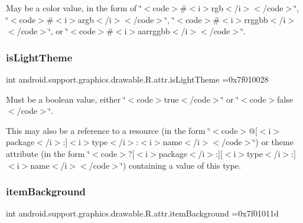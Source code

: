 May be a color value, in the form of \char`\"{}$<$code$>$\#$<$i$>$rgb$<$/i$>$$<$/code$>$\char`\"{}, \char`\"{}$<$code$>$\#$<$i$>$argb$<$/i$>$$<$/code$>$\char`\"{}, \char`\"{}$<$code$>$\#$<$i$>$rrggbb$<$/i$>$$<$/code$>$\char`\"{}, or \char`\"{}$<$code$>$\#$<$i$>$aarrggbb$<$/i$>$$<$/code$>$\char`\"{}. \mbox{\label{classandroid_1_1support_1_1graphics_1_1drawable_1_1R_1_1attr_a944a417aea3eaf866564a4350a4bd95a}} 
\subsubsection{\texorpdfstring{is\+Light\+Theme}{isLightTheme}}
{\footnotesize\ttfamily int android.\+support.\+graphics.\+drawable.\+R.\+attr.\+is\+Light\+Theme =0x7f010028\hspace{0.3cm}{\ttfamily [static]}}

Must be a boolean value, either \char`\"{}$<$code$>$true$<$/code$>$\char`\"{} or \char`\"{}$<$code$>$false$<$/code$>$\char`\"{}. 

This may also be a reference to a resource (in the form \char`\"{}$<$code$>$@\mbox{[}$<$i$>$package$<$/i$>$\+:\mbox{]}$<$i$>$type$<$/i$>$\+:$<$i$>$name$<$/i$>$$<$/code$>$\char`\"{}) or theme attribute (in the form \char`\"{}$<$code$>$?\mbox{[}$<$i$>$package$<$/i$>$\+:\mbox{]}\mbox{[}$<$i$>$type$<$/i$>$\+:\mbox{]}$<$i$>$name$<$/i$>$$<$/code$>$\char`\"{}) containing a value of this type. \mbox{\label{classandroid_1_1support_1_1graphics_1_1drawable_1_1R_1_1attr_ad8b8904cbda1bf47a665ff33356a36ec}} 
\subsubsection{\texorpdfstring{item\+Background}{itemBackground}}
{\footnotesize\ttfamily int android.\+support.\+graphics.\+drawable.\+R.\+attr.\+item\+Background =0x7f01011d\hspace{0.3cm}{\ttfamily [static]}}

